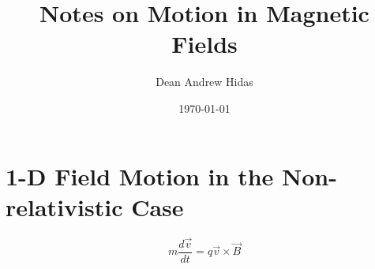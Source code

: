 \documentclass{article}
\title{Notes on Motion in Magnetic Fields}
\author{Dean Andrew Hidas}
\date{\today}
\begin{document}
\maketitle

\section{1-D Field Motion in the Non-relativistic Case}
\begin{equation}
m \frac{d\vec v}{dt} = q \vec v \times \vec B
\end{equation}
\end{document}
